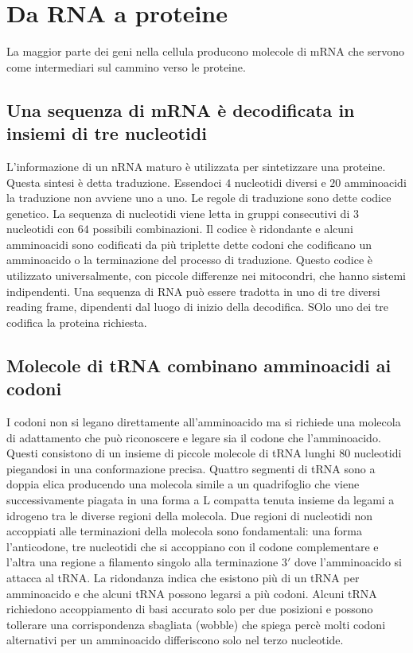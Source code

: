 \section{Da RNA a proteine}
La maggior parte dei geni nella cellula producono molecole di mRNA che servono come intermediari sul cammino verso le proteine. 
\subsection{Una sequenza di mRNA \`e decodificata in insiemi di tre nucleotidi}
L'informazione di un nRNA maturo \`e utilizzata per sintetizzare una proteine. Questa sintesi \`e detta traduzione. Essendoci $4$ nucleotidi diversi e $20$ amminoacidi la traduzione non
avviene uno a uno. Le regole di traduzione sono dette codice genetico. La sequenza di nucleotidi viene letta in gruppi consecutivi di $3$ nucleotidi con $64$ possibili combinazioni. 
Il codice \`e ridondante e alcuni amminoacidi sono codificati da pi\`u triplette dette codoni che codificano un amminoacido o la terminazione del processo di traduzione. Questo codice
\`e utilizzato universalmente, con piccole differenze nei mitocondri, che hanno sistemi indipendenti. Una sequenza di RNA pu\`o essere tradotta in uno di tre diversi reading frame, 
dipendenti dal luogo di inizio della decodifica. SOlo uno dei tre codifica la proteina richiesta. 
\subsection{Molecole di tRNA combinano amminoacidi ai codoni}
I codoni non si legano direttamente all'amminoacido ma si richiede una molecola di adattamento che pu\`o riconoscere e legare sia il codone che l'amminoacido. Questi consistono di un
insieme di piccole molecole di tRNA lunghi $80$ nucleotidi piegandosi in una conformazione precisa. Quattro segmenti di tRNA sono a doppia elica producendo una molecola simile a un
quadrifoglio che viene successivamente piagata in una forma a L compatta tenuta insieme da legami a idrogeno tra le diverse regioni della molecola. Due regioni di nucleotidi non
accoppiati alle terminazioni della molecola sono fondamentali: una forma l'anticodone, tre nucleotidi che si accoppiano con il codone complementare e l'altra una regione a filamento
singolo alla terminazione $3'$ dove l'amminoacido si attacca al tRNA. La ridondanza indica che esistono pi\`u di un tRNA per amminoacido e che alcuni tRNA possono legarsi a pi\`u codoni.
Alcuni tRNA richiedono accoppiamento di basi accurato solo per due posizioni e possono tollerare una corrispondenza sbagliata (wobble) che spiega perc\`e molti codoni 
alternativi per un amminoacido differiscono solo nel terzo nucleotide. 
